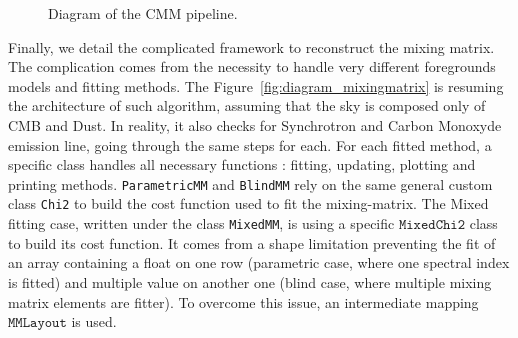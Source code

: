 \documentclass[../../thesis.tex]{subfiles}
\begin{document}
\begin{figure}[htbp]
{%
}
\caption{Diagram of the CMM pipeline.
}
\label{fig:diagram_cmm}
\end{figure}

Finally, we detail the complicated framework to reconstruct the mixing matrix. The complication comes from the necessity to handle very different foregrounds models and fitting methods. The Figure~\ref{fig:diagram_mixingmatrix} is resuming the architecture of such algorithm, assuming that the sky is composed only of CMB and Dust. In reality, it also checks for Synchrotron and Carbon Monoxyde emission line, going through the same steps for each.
For each fitted method, a specific class handles all necessary functions : fitting, updating, plotting and printing methods. \texttt{ParametricMM} and \texttt{BlindMM} rely on the same general custom class \texttt{Chi2} to build the cost function used to fit the mixing-matrix. The Mixed fitting case, written under the class \texttt{MixedMM}, is using a specific $\texttt{MixedChi2}$ class to build its cost function. It comes from a shape limitation preventing the fit of an array containing a float on one row (parametric case, where one spectral index is fitted) and multiple value on another one (blind case, where multiple mixing matrix elements are fitter). To overcome this issue, an intermediate mapping $\texttt{MMLayout}$ is used.
\end{document}

